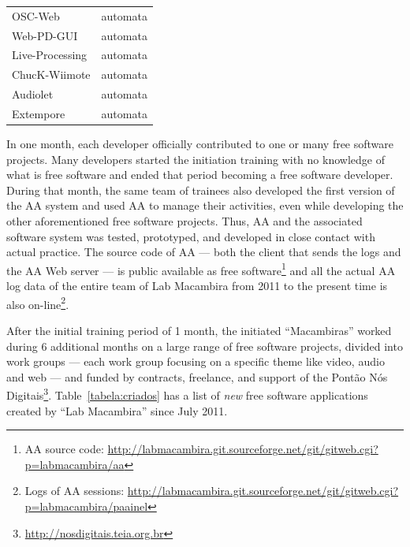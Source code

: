 \documentclass{article}
\begin{document}
\begin{table}
\begin{center}
\begin{tabular}{|l|l|}
        OSC-Web               & automata                            \\
        Web-PD-GUI            & automata                            \\
        Live-Processing       & automata                            \\
        ChucK-Wiimote         & automata                            \\
        Audiolet              & automata                            \\
        Extempore             & automata                            \\
        \hline
    \end{tabular}
    \end{center}
    \label{tabela:contribuicoes}
\end{table}

In one month, each developer officially contributed to one or many free software
projects. Many developers started the initiation training with no knowledge of what
is free software and ended that period becoming a free software developer.
During that month, the same team of trainees also developed the first version of the AA
system and used AA to manage their activities, even while developing
the other aforementioned free software projects. Thus, AA and the associated
software system was tested, prototyped, and developed in close contact with
actual practice.  The source code of AA --- both the client that sends the
logs and the AA Web server --- is public available as free software\footnote{AA source
  code:
  \url{http://labmacambira.git.sourceforge.net/git/gitweb.cgi?p=labmacambira/aa}}
and all the actual AA log data of the entire team of Lab Macambira from 2011 to
the present time is also on-line\footnote{Logs of AA sessions:
  \url{http://labmacambira.git.sourceforge.net/git/gitweb.cgi?p=labmacambira/paainel}}.

After the initial training period of 1 month, the initiated ``Macambiras''
worked during 6 additional months on a large range of free software projects,
divided into work groups --- each work group focusing on a specific theme like
video, audio and web --- and funded by contracts, freelance, and support of the
Pont\~{a}o N\'{o}s Digitais\footnote{\url{http://nosdigitais.teia.org.br}}.
Table~\ref{tabela:criados} has a list of \emph{new} free software applications
created by ``Lab Macambira'' since July 2011.
\end{document}
